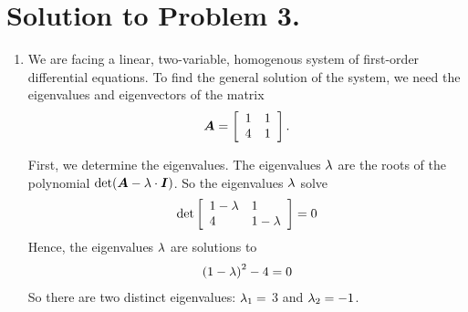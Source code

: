 \documentclass[letterpaper,12pt,leqno]{article}
\begin{document}
\section*{Solution to Problem 3.}
\begin{enumerate}
\item We are facing a linear, two-variable, homogenous system of first-order differential equations. To find the general solution of the system, we need the eigenvalues and eigenvectors of the matrix 
\begin{align*}
\bm{A}=\left[ 
\begin{array}{ll}
1 & 1 \\ 
4 & 1 
\end{array} \right].
\end{align*}

First, we determine the eigenvalues. The eigenvalues $\lambda$ are the roots of the polynomial $\det(\bm{A}-\lambda\cdot \bm{I})$. So the eigenvalues $\lambda$ solve
 \begin{align*}
\det\left[ \begin{array}{ll}
1-\lambda & 1 \\ 
4 & 1-\lambda 
\end{array} \right] =0
\end{align*}
Hence, the eigenvalues $\lambda$ are solutions to
\begin{align*}
\left( 1-\lambda \right) ^{2}-4=0
\end{align*}
So there are two distinct eigenvalues: $\lambda_{1}=$ $3$ and $\lambda_{2}=-1$.


\end{enumerate}
\end{document}
